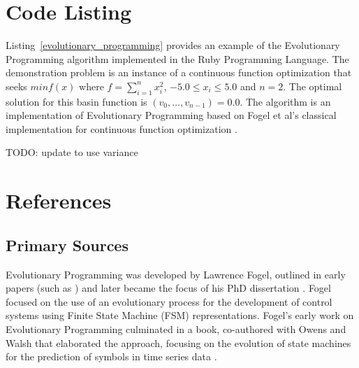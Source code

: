 \documentclass[a4paper, 11pt]{article}
\begin{document}
\section{Code Listing}
\label{sec:code}
Listing~\ref{evolutionary_programming} provides an example of the Evolutionary Programming algorithm implemented in the Ruby Programming Language.
The demonstration problem is an instance of a continuous function optimization that seeks $min f(x)$ where $f=\sum_{i=1}^n x_{i}^2$, $-5.0\leq x_i \leq 5.0$ and $n=2$. The optimal solution for this basin function is $(v_0,\ldots,v_{n-1})=0.0$.
The algorithm is an implementation of Evolutionary Programming based on Fogel et al's classical implementation for continuous function optimization \cite{Fogel1991a}.

TODO: update to use variance




\section{References}
\label{sec:references}


% 
% 
\subsection{Primary Sources}
Evolutionary Programming was developed by Lawrence Fogel, outlined in early papers (such as \cite{Fogel1962}) and later became the focus of his PhD dissertation \cite{Fogel1964}. Fogel focused on the use of an evolutionary process for the development of control systems using Finite State Machine (FSM) representations. 
Fogel's early work on Evolutionary Programming culminated in a book, co-authored with Owens and Walsh that elaborated the approach, focusing on the evolution of state machines for the prediction of symbols in time series data \cite{Fogel1966}.
\end{document}
